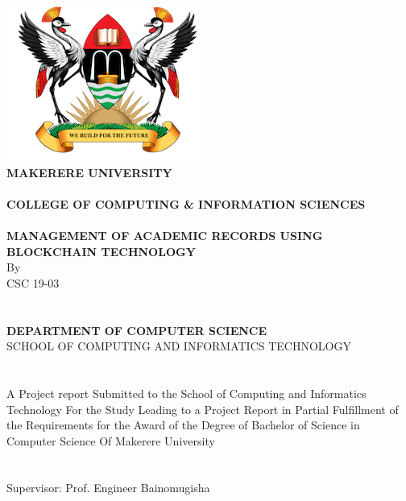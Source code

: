 \begin{titlepage}
\begin{center}

		\includegraphics{images/muklogo2.png} \\
		
\textbf{MAKERERE UNIVERSITY}\\~\\

\textbf{COLLEGE OF COMPUTING \& INFORMATION SCIENCES}\\~\\
\textbf{MANAGEMENT OF ACADEMIC RECORDS USING BLOCKCHAIN TECHNOLOGY}\\
By \\ 
CSC 19-03\\~\\~\\
\textbf{DEPARTMENT OF COMPUTER SCIENCE}\\
\normalsize{SCHOOL OF COMPUTING AND INFORMATICS TECHNOLOGY}\\~\\~\\
A Project report Submitted to the School of Computing and Informatics Technology
For the Study Leading to a Project Report in Partial Fulfillment of the
Requirements for the Award of the Degree of Bachelor of Science in Computer Science 
Of Makerere University\\~\\~\\
Supervisor: Prof. Engineer Bainomugisha\\~\\


\end{center}
\end{titlepage}
